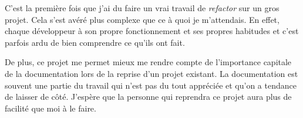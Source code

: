 C'est la première fois que j'ai du faire un vrai travail de \emph{refactor} sur un gros projet. Cela s'est avéré plus complexe que ce à quoi je m'attendais. En effet, chaque développeur à son propre fonctionnement et ses propres habitudes et c'est parfois ardu de bien comprendre ce qu'ils ont fait.

De plus, ce projet me permet mieux me rendre compte de l'importance capitale de la documentation lors de la reprise d'un projet existant. La documentation est souvent une partie du travail qui n'est pas du tout appréciée et qu'on a tendance de laisser de côté. J'espère que la personne qui reprendra ce projet aura plus de facilité que moi à le faire.

\vfil
\hspace{8cm}\makeatletter\@author\makeatother\par
\hspace{8cm}\begin{minipage}{5cm}
    \printsignature
\end{minipage}
